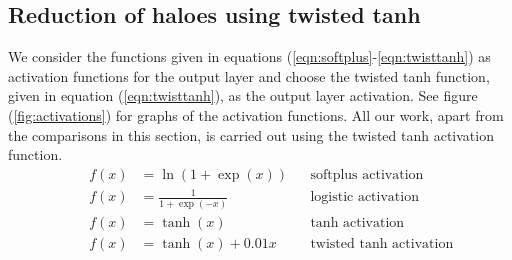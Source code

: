 \documentclass[12pt]{article}
\begin{document}
\subsection{\label{sect:outputact} Reduction of haloes using twisted tanh}
%
We consider the functions given in equations (\ref{eqn:softplus}-\ref{eqn:twisttanh}) as activation functions for the output layer and choose the twisted tanh function, given in equation (\ref{eqn:twisttanh}), as the output layer activation. See figure (\ref{fig:activations}) for graphs of the activation functions. All our work, apart from the comparisons in this section, is carried out using the twisted tanh activation function.
%
\begin{subequations}
\begin{flalign}
&& f(x) &= \ln(1+\exp(x))   &&\text{softplus activation} \label{eqn:softplus}\\
&& f(x) &= \frac{1}{1+\exp(-x)} &&\text{logistic activation} \label{eqn:logistic}\\
&& f(x) &= \tanh(x)    &&\text{tanh activation} \label{eqn:tanh}\\
&& f(x) &= \tanh(x) + 0.01x &&\text{twisted tanh activation} \label{eqn:twisttanh}
\end{flalign}
\label{eqn:activations}
\end{subequations}
%
\end{document}
